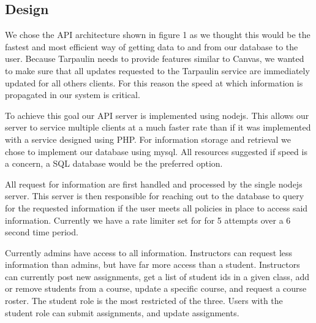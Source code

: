 \documentclass[a4paper]{article}
\begin{document}
\subsection{Design}
We chose the API architecture shown in figure 1 as we thought this would be the fastest and most efficient way of getting data to and from our database to the user. Because Tarpaulin needs to provide features similar to Canvas, we wanted to make sure that all updates requested to the Tarpaulin service are immediately updated for all others clients. For this reason the speed at which information is propagated in our system is critical. 
\par
\noindent
To achieve this goal our API server is implemented using nodejs. This allows our server to service multiple clients at a much faster rate than if it was implemented with a service designed using PHP. For information storage and retrieval we chose to implement our database using mysql. All resources suggested if speed is a concern, a SQL database would be the preferred option.
\par
\noindent
All request for information are first handled and processed by the single nodejs server. This server is then responsible for reaching out to the database to query for the requested information if the user meets all policies in place to access said information. Currently we have a rate limiter set for for 5 attempts over a 6 second time period. 

\par
\noindent
Currently admins have access to all information. Instructors can request less information than admins, but have far more access than a student. Instructors can currently post new assignments, get a list of student ids in a given class, add or remove students from a course, update a specific course, and request a course roster. The student role is the most restricted of the three. Users with the student role can submit assignments, and update assignments.
\newpage
\end{document}
